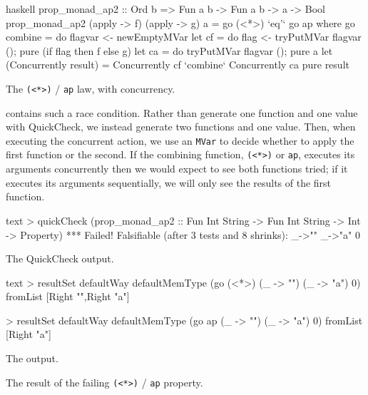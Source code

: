\begin{listing}
\centering
\begin{cminted}{haskell}
prop_monad_ap2 :: Ord b => Fun a b -> Fun a b -> a -> Bool
prop_monad_ap2 (apply -> f) (apply -> g) a = go (<*>) `eq'` go ap where
  go combine = do
    flagvar <- newEmptyMVar
    let cf = do { flag <- tryPutMVar flagvar (); pure (if flag then f else g) }
    let ca = do { tryPutMVar flagvar (); pure a }
    let (Concurrently result) = Concurrently cf `combine` Concurrently ca
    pure result
\end{cminted}
\caption{The \texttt{(<*>)} / \texttt{ap} law, with concurrency.}\label{lst:aplaw2}
\end{listing}

 contains such a race condition.  Rather than
generate one function and one value with QuickCheck, we instead
generate two functions and one value.  Then, when executing the
concurrent action, we use an \verb|MVar| to decide whether to apply
the first function or the second.  If the combining function,
\verb|(<*>)| or \verb|ap|, executes its arguments concurrently then we
would expect to see both functions tried; if it executes its arguments
sequentially, we will only see the results of the first function.

\begin{listing}
\begin{sublisting}{\textwidth}
\centering
\begin{cminted}{text}
> quickCheck (prop_monad_ap2 :: Fun Int String -> Fun Int String -> Int -> Property)
*** Failed! Falsifiable (after 3 tests and 8 shrinks):
{_->""}
{_->"a"}
0
\end{cminted}
\caption{The QuickCheck output.}\label{lst:aplaw3_quickcheck}
\end{sublisting}

\vspace{2.5em}

\begin{sublisting}{\textwidth}
\centering
\begin{cminted}{text}
> resultSet defaultWay defaultMemType (go (<*>) (\_ -> "") (\_ -> "a") 0)
fromList [Right "",Right "a"]

> resultSet defaultWay defaultMemType (go ap (\_ -> "") (\_ -> "a") 0)
fromList [Right "a"]
\end{cminted}
\caption{The \dejafu{} output.}\label{lst:aplaw3_dejafu}
\end{sublisting}
\caption{The result of the failing \texttt{(<*>)} / \texttt{ap} property.}\label{lst:aplaw3}
\end{listing}

